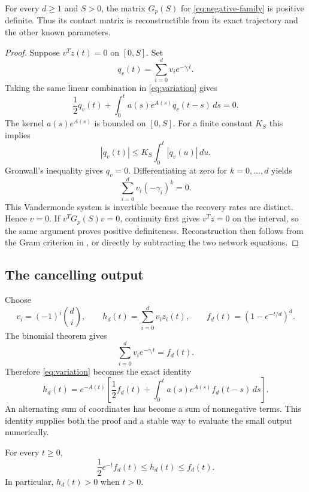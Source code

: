 \begin{proposition}
\label{prop:reconstructible}
For every $d\geq1$ and $S>0$, the matrix $G_p(S)$ for \eqref{eq:negative-family} is positive definite. Thus its contact matrix is reconstructible from its exact trajectory and the other known parameters.
\end{proposition}

\begin{proof}
Suppose $v^Tz(t)=0$ on $[0,S]$. Set
\[
 q_v(t)=\sum_{i=0}^dv_i e^{-\gamma_it}.
\]
Taking the same linear combination in \eqref{eq:variation} gives
\[
 \frac12q_v(t)+\int_0^ta(s)e^{A(s)}q_v(t-s)\,ds=0.
\]
The kernel $a(s)e^{A(s)}$ is bounded on $[0,S]$. For a finite constant $K_S$ this implies
\[
 |q_v(t)|\leq K_S\int_0^t|q_v(u)|\,du.
\]
Gronwall's inequality gives $q_v=0$. Differentiating at zero for $k=0,\ldots,d$ yields
\[
 \sum_{i=0}^dv_i(-\gamma_i)^k=0.
\]
This Vandermonde system is invertible because the recovery rates are distinct. Hence $v=0$. If $v^TG_p(S)v=0$, continuity first gives $v^Tz=0$ on the interval, so the same argument proves positive definiteness. Reconstruction then follows from the Gram criterion in \cite[Theorem 3.1]{KH2026}, or directly by subtracting the two network equations.
\end{proof}

\subsection{The cancelling output}

Choose
\begin{equation}
 v_i=(-1)^i\binom di,\qquad
 h_d(t)=\sum_{i=0}^dv_i z_i(t),\qquad
 f_d(t)=(1-e^{-t/d})^d.
 \label{eq:binomial}
\end{equation}
The binomial theorem gives
\[
 \sum_{i=0}^dv_i e^{-\gamma_it}=f_d(t).
\]
Therefore \eqref{eq:variation} becomes the exact identity
\begin{equation}
 h_d(t)=e^{-A(t)}\left[
  \frac12f_d(t)+\int_0^ta(s)e^{A(s)}f_d(t-s)\,ds
 \right].
 \label{eq:positive-convolution}
\end{equation}
An alternating sum of coordinates has become a sum of nonnegative terms. This identity supplies both the proof and a stable way to evaluate the small output numerically.

\begin{lemma}
\label{lem:output-bounds}
For every $t\geq0$,
\begin{equation}
 \frac12e^{-t}f_d(t)\leq h_d(t)\leq f_d(t).
 \label{eq:output-bounds}
\end{equation}
In particular, $h_d(t)>0$ when $t>0$.
\end{lemma}


